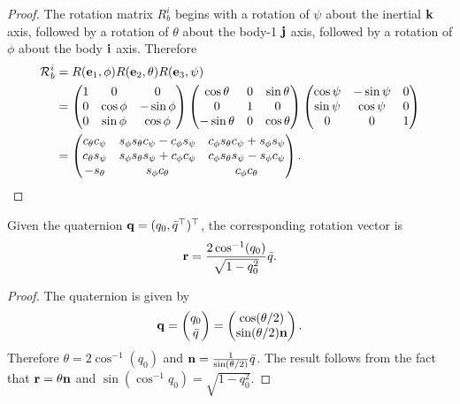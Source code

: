 \begin{proof}
The rotation matrix $R_b^i$ begins with a rotation of $\psi$ about the inertial $\mathbf{k}$ axis, followed by a rotation of $\theta$ about the body-1 $\mathbf{j}$ axis, followed by a rotation of $\phi$ about the body $\mathbf{i}$ axis.  
Therefore
{\footnotesize
\begin{align}
\mathcal{R}_b^i &= R(\ebf_1, \phi) R(\ebf_2, \theta) R(\ebf_3, \psi) \\
&=
    \begin{pmatrix}
        1 & 0 & 0 \\
        0 & \cos\phi & -\sin\phi \\
        0 & \sin\phi & \cos\phi
    \end{pmatrix}
    \begin{pmatrix}
        \cos\theta& 0 & \sin\theta \\
        0 & 1 & 0 \\
        -\sin\theta & 0 & \cos\theta
    \end{pmatrix}
    \begin{pmatrix}
        \cos\psi & -\sin\psi & 0 \\
        \sin\psi & \cos\psi & 0 \\
        0 & 0 & 1
    \end{pmatrix} \notag \\
&= \begin{pmatrix}
	c_\theta c_\psi & s_\phi s_\theta c_\psi - c_\phi s_\psi & c_\phi s_\theta c_\psi + s_\phi s_\psi \\
	c_\theta s_\psi & s_\phi s_\theta s_\psi + c_\phi c_\psi & c_\phi s_\theta s_\psi - s_\phi c_\psi \\
	-s_\theta & s_\phi c_\theta & c_\phi c_\theta
    \end{pmatrix}.  \label{eq:euler_to_rotmat}
\end{align}
}
\end{proof}


\begin{lemma}
Given the quaternion $\mathbf{q} = (q_0, \bar{q}^\top)^\top$, the corresponding rotation vector is
\[
\mathbf{r} = \frac{2\cos^{-1}(q_0)}{\sqrt{1-q_0^2}}\bar{q}.
\]	
\end{lemma}
\begin{proof}
The quaternion is given by
\[
\mathbf{q} = \begin{pmatrix} q_0 \\ \bar{q} \end{pmatrix} = \begin{pmatrix} \cos(\theta/2) \\ \sin(\theta/2)\mathbf{n} \end{pmatrix}.
\]	
Therefore $\theta = 2\cos^{-1}(q_0)$ and $\mathbf{n} = \frac{1}{\sin(\theta/2)}\bar{q}$.  The result follows from the fact that $\mathbf{r} = \theta\mathbf{n}$ and $\sin(\cos^{-1}q_0)=\sqrt{1-q_0^2}$.
\end{proof}


